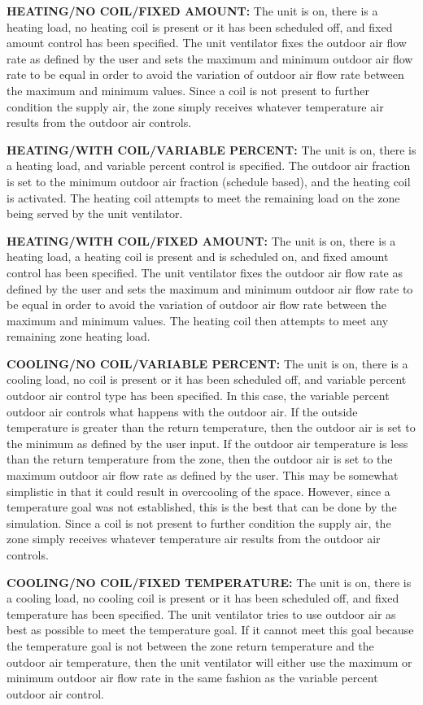 \textbf{HEATING/NO COIL/FIXED AMOUNT:} The unit is on, there is a heating load, no heating coil is present or it has been scheduled off, and fixed amount control has been specified. The unit ventilator fixes the outdoor air flow rate as defined by the user and sets the maximum and minimum outdoor air flow rate to be equal in order to avoid the variation of outdoor air flow rate between the maximum and minimum values. Since a coil is not present to further condition the supply air, the zone simply receives whatever temperature air results from the outdoor air controls.

\textbf{HEATING/WITH COIL/VARIABLE PERCENT:} The unit is on, there is a heating load, and variable percent control is specified. The outdoor air fraction is set to the minimum outdoor air fraction (schedule based), and the heating coil is activated. The heating coil attempts to meet the remaining load on the zone being served by the unit ventilator.

\textbf{HEATING/WITH COIL/FIXED AMOUNT:} The unit is on, there is a heating load, a heating coil is present and is scheduled on, and fixed amount control has been specified. The unit ventilator fixes the outdoor air flow rate as defined by the user and sets the maximum and minimum outdoor air flow rate to be equal in order to avoid the variation of outdoor air flow rate between the maximum and minimum values. The heating coil then attempts to meet any remaining zone heating load.

\textbf{COOLING/NO COIL/VARIABLE PERCENT:} The unit is on, there is a cooling load, no coil is present or it has been scheduled off, and variable percent outdoor air control type has been specified. In this case, the variable percent outdoor air controls what happens with the outdoor air. If the outside temperature is greater than the return temperature, then the outdoor air is set to the minimum as defined by the user input. If the outdoor air temperature is less than the return temperature from the zone, then the outdoor air is set to the maximum outdoor air flow rate as defined by the user. This may be somewhat simplistic in that it could result in overcooling of the space. However, since a temperature goal was not established, this is the best that can be done by the simulation. Since a coil is not present to further condition the supply air, the zone simply receives whatever temperature air results from the outdoor air controls.

\textbf{COOLING/NO COIL/FIXED TEMPERATURE:} The unit is on, there is a cooling load, no cooling coil is present or it has been scheduled off, and fixed temperature has been specified. The unit ventilator tries to use outdoor air as best as possible to meet the temperature goal. If it cannot meet this goal because the temperature goal is not between the zone return temperature and the outdoor air temperature, then the unit ventilator will either use the maximum or minimum outdoor air flow rate in the same fashion as the variable percent outdoor air control.

